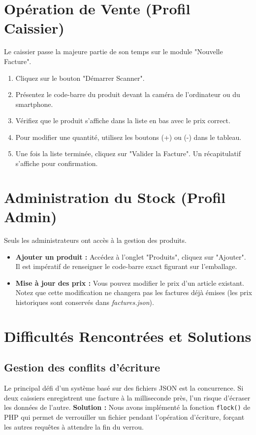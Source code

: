 \documentclass[12pt,a4paper]{report}
\begin{document}
\section{Opération de Vente (Profil Caissier)}
Le caissier passe la majeure partie de son temps sur le module "Nouvelle Facture".
\begin{enumerate}
    \item Cliquez sur le bouton "Démarrer Scanner".
    \item Présentez le code-barre du produit devant la caméra de l'ordinateur ou du smartphone.
    \item Vérifiez que le produit s'affiche dans la liste en bas avec le prix correct.
    \item Pour modifier une quantité, utilisez les boutons (+) ou (-) dans le tableau.
    \item Une fois la liste terminée, cliquez sur "Valider la Facture". Un récapitulatif s'affiche pour confirmation.
\end{enumerate}

\section{Administration du Stock (Profil Admin)}
Seuls les administrateurs ont accès à la gestion des produits.
\begin{itemize}
    \item \textbf{Ajouter un produit :} Accédez à l'onglet "Produits", cliquez sur "Ajouter". Il est impératif de renseigner le code-barre exact figurant sur l'emballage.
    \item \textbf{Mise à jour des prix :} Vous pouvez modifier le prix d'un article existant. Notez que cette modification ne changera pas les factures déjà émises (les prix historiques sont conservés dans \textit{factures.json}).
\end{itemize}

\section{Difficultés Rencontrées et Solutions}
\subsection{Gestion des conflits d'écriture}
Le principal défi d'un système basé sur des fichiers JSON est la concurrence. Si deux caissiers enregistrent une facture à la milliseconde près, l'un risque d'écraser les données de l'autre.
\textbf{Solution :} Nous avons implémenté la fonction \texttt{flock()} de PHP qui permet de verrouiller un fichier pendant l'opération d'écriture, forçant les autres requêtes à attendre la fin du verrou.
\end{document}
